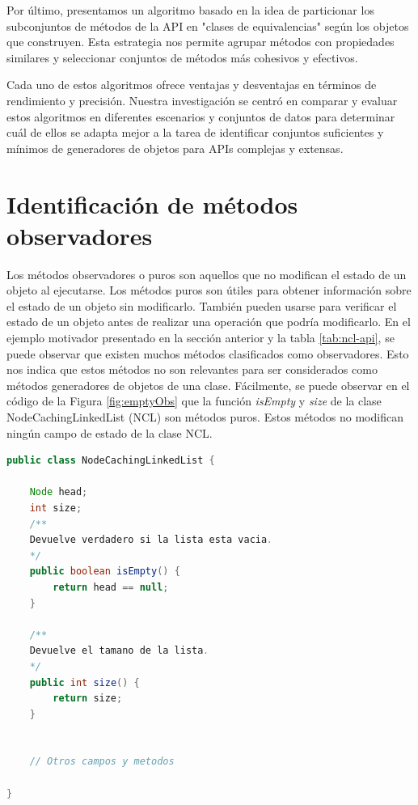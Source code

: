 Por último, presentamos un algoritmo basado en la idea de particionar los subconjuntos de métodos de la API en "clases de equivalencias" según los objetos que construyen. Esta estrategia nos permite agrupar métodos con propiedades similares y seleccionar conjuntos de métodos más cohesivos y efectivos.

Cada uno de estos algoritmos ofrece ventajas y desventajas en términos de rendimiento y precisión. Nuestra investigación se centró en comparar y evaluar estos algoritmos en diferentes escenarios y conjuntos de datos para determinar cuál de ellos se adapta mejor a la tarea de identificar conjuntos suficientes y mínimos de generadores de objetos para APIs complejas y extensas.


\section{Identificación de métodos observadores}

Los métodos observadores o puros son aquellos que no modifican el estado de un objeto al ejecutarse. Los métodos puros son útiles para obtener información sobre el estado de un objeto sin modificarlo. También pueden usarse para verificar el estado de un objeto antes de realizar una operación que podría modificarlo. En el ejemplo motivador presentado en la sección anterior y la tabla \ref{tab:ncl-api}, se puede observar que existen muchos métodos clasificados como observadores. Esto nos indica que estos métodos no son relevantes para ser considerados como métodos generadores de objetos de una clase. 
Fácilmente, se puede observar en el código de la Figura \ref{fig:emptyObs} que la función \emph{isEmpty} y \emph{size} de la clase NodeCachingLinkedList (NCL) son métodos puros.  Estos  métodos no modifican ningún campo de estado de la clase NCL.
\begin{lstlisting}[language=Java, label=fig:emptyObs, caption=Métodos observadores de la clase NCL. Se observa que no modifican el estado de NCL., captionpos=b, frame=tb, float=t]
public class NodeCachingLinkedList {

    Node head;
    int size;
    /**
    Devuelve verdadero si la lista esta vacia. 
    */ 
    public boolean isEmpty() { 
        return head == null; 
    }
    
    /**
    Devuelve el tamano de la lista. 
    */ 
    public int size() { 
        return size; 
    }
    
    
    // Otros campos y metodos
    
}
\end{lstlisting}


